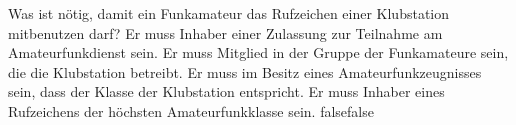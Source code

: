     {Was ist nötig, damit ein Funkamateur das Rufzeichen einer Klubstation mitbenutzen darf?}
    {Er muss Inhaber einer Zulassung zur Teilnahme am Amateurfunkdienst sein.}
    {Er muss Mitglied in der Gruppe der Funkamateure sein, die die Klubstation betreibt.}
    {Er muss im Besitz eines Amateurfunkzeugnisses sein, dass der Klasse der Klubstation entspricht.}
    {Er muss Inhaber eines Rufzeichens der höchsten Amateurfunkklasse sein.}
    {false}{false}